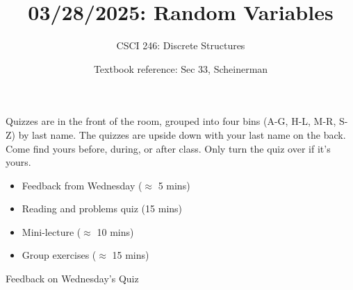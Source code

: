 \documentclass[10pt]{beamer}
\begin{document}




\title{03/28/2025: Random Variables}
\author{CSCI 246: Discrete Structures}
\date{Textbook reference: Sec 33, Scheinerman}

\begin{frame}
    \titlepage 
\end{frame}


\begin{frame}
\small
\begin{mygreenbox}[title=Graded Quiz Pickup]
Quizzes are in the front of the room, grouped into four bins (A-G, H-L, M-R, S-Z) by last name. The quizzes are upside down with your last name on the back. Come find yours before, during, or after class. Only turn the quiz over if it's yours. \\ 

\end{mygreenbox} 
\vfill 

\begin{myredbox}[title=Today's Agenda]
\begin{itemize}
	\item Feedback from Wednesday ($\approx$ 5 mins)
	\item Reading and problems quiz (15 mins)
	\item Mini-lecture ($\approx$ 10 mins)
	\item Group exercises ($\approx$ 15 mins)
\end{itemize}


\end{myredbox}
\vfill 

\end{frame}






\begin{frame}[standout]
Feedback on Wednesday's Quiz
\end{frame}
\end{document}
